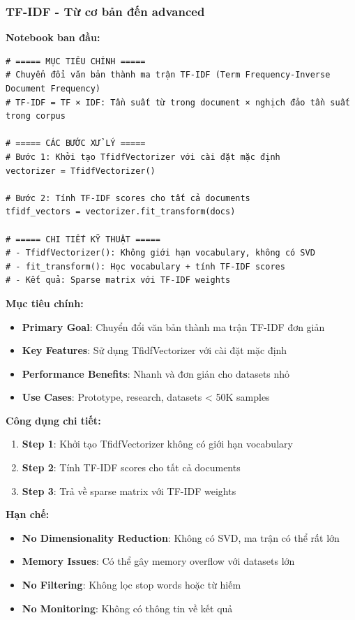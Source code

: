 \subsubsection{TF-IDF - Từ cơ bản đến advanced}

\textbf{Notebook ban đầu:}
\begin{verbatim}
# ===== MỤC TIÊU CHÍNH =====
# Chuyển đổi văn bản thành ma trận TF-IDF (Term Frequency-Inverse Document Frequency)
# TF-IDF = TF × IDF: Tần suất từ trong document × nghịch đảo tần suất trong corpus

# ===== CÁC BƯỚC XỬ LÝ =====
# Bước 1: Khởi tạo TfidfVectorizer với cài đặt mặc định
vectorizer = TfidfVectorizer()

# Bước 2: Tính TF-IDF scores cho tất cả documents
tfidf_vectors = vectorizer.fit_transform(docs)

# ===== CHI TIẾT KỸ THUẬT =====
# - TfidfVectorizer(): Không giới hạn vocabulary, không có SVD
# - fit_transform(): Học vocabulary + tính TF-IDF scores
# - Kết quả: Sparse matrix với TF-IDF weights
\end{verbatim}

\textbf{Mục tiêu chính:}
\begin{itemize}
    \item \textbf{Primary Goal}: Chuyển đổi văn bản thành ma trận TF-IDF đơn giản
    \item \textbf{Key Features}: Sử dụng TfidfVectorizer với cài đặt mặc định
    \item \textbf{Performance Benefits}: Nhanh và đơn giản cho datasets nhỏ
    \item \textbf{Use Cases}: Prototype, research, datasets < 50K samples
\end{itemize}

\textbf{Công dụng chi tiết:}
\begin{enumerate}
    \item \textbf{Step 1}: Khởi tạo TfidfVectorizer không có giới hạn vocabulary
    \item \textbf{Step 2}: Tính TF-IDF scores cho tất cả documents
    \item \textbf{Step 3}: Trả về sparse matrix với TF-IDF weights
\end{enumerate}

\textbf{Hạn chế:}
\begin{itemize}
    \item \textbf{No Dimensionality Reduction}: Không có SVD, ma trận có thể rất lớn
    \item \textbf{Memory Issues}: Có thể gây memory overflow với datasets lớn
    \item \textbf{No Filtering}: Không lọc stop words hoặc từ hiếm
    \item \textbf{No Monitoring}: Không có thông tin về kết quả
\end{itemize}

